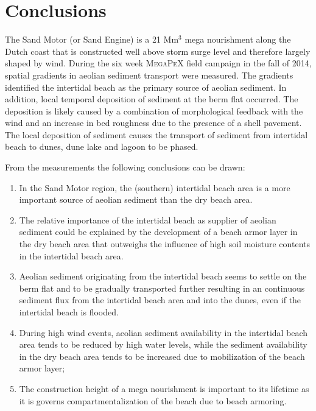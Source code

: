 \section{Conclusions}

The Sand Motor (or Sand Engine) is a 21 $\mathrm{Mm^3}$ mega
nourishment along the Dutch coast that is constructed well above storm
surge level \citep{Stive2013} and therefore largely shaped by
wind. During the six week \textsc{MegaPeX} field campaign in the fall
of 2014, spatial gradients in aeolian sediment transport were
measured. The gradients identified the intertidal beach as the primary
source of aeolian sediment. In addition, local temporal deposition of
sediment at the berm flat occurred. The deposition is likely caused by
a combination of morphological feedback with the wind and an increase
in bed roughness due to the presence of a shell pavement. The local
deposition of sediment causes the transport of sediment from
intertidal beach to dunes, dune lake and lagoon to be phased.

\bigskip

\noindent From the measurements the following conclusions can be drawn:

\begin{enumerate}
\item In the Sand Motor region, the (southern) intertidal beach area
  is a more important source of aeolian sediment than the dry beach
  area.
\item The relative importance of the intertidal beach as supplier of
  aeolian sediment could be explained by the development of a beach
  armor layer in the dry beach area that outweighs the influence of
  high soil moisture contents in the intertidal beach area.
\item Aeolian sediment originating from the intertidal beach seems to
  settle on the berm flat and to be gradually transported further
  resulting in an continuous sediment flux from the intertidal beach
  area and into the dunes, even if the intertidal beach is flooded.
\item During high wind events, aeolian sediment availability in the
  intertidal beach area tends to be reduced by high water levels,
  while the sediment availability in the dry beach area tends to be
  increased due to mobilization of the beach armor layer;
\item The construction height of a mega nourishment is important to
  its lifetime as it is governs compartmentalization of the beach due
  to beach armoring.
\end{enumerate}

